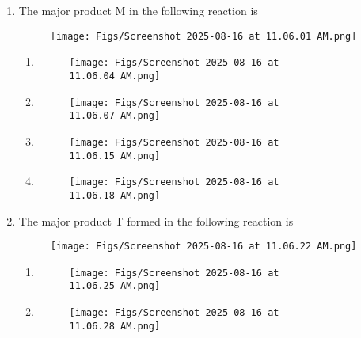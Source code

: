 \documentclass[12pt]{article}
\begin{document}
\begin{enumerate}
\item The major product M in the following reaction is
\begin{figure}[H]
\centering
\texttt{[image: Figs/Screenshot 2025-08-16 at 11.06.01 AM.png]}
\caption{}
\end{figure}

\begin{enumerate} 
    \item \begin{figure}[H]
\centering
\texttt{[image: Figs/Screenshot 2025-08-16 at 11.06.04 AM.png]}
\caption{}
\end{figure}

\item  \begin{figure}[H]
\centering
\texttt{[image: Figs/Screenshot 2025-08-16 at 11.06.07 AM.png]}
\caption{}
\end{figure}


\item  \begin{figure}[H]
\centering
\texttt{[image: Figs/Screenshot 2025-08-16 at 11.06.15 AM.png]}
\caption{}
\end{figure}

\item  
\begin{figure}[H]
\centering
\texttt{[image: Figs/Screenshot 2025-08-16 at 11.06.18 AM.png]}
\caption{}
\end{figure}
\end{enumerate}





\item The major product T formed in the following reaction is
\begin{figure}[H]
\centering
\texttt{[image: Figs/Screenshot 2025-08-16 at 11.06.22 AM.png]}
\caption{}
\end{figure}

\begin{enumerate} 
    \item \begin{figure}[H]
\centering
\texttt{[image: Figs/Screenshot 2025-08-16 at 11.06.25 AM.png]}
\caption{}
\end{figure}

\item  \begin{figure}[H]
\centering
\texttt{[image: Figs/Screenshot 2025-08-16 at 11.06.28 AM.png]}
\caption{}
\end{figure}



\end{enumerate}
\end{enumerate}
\end{document}
